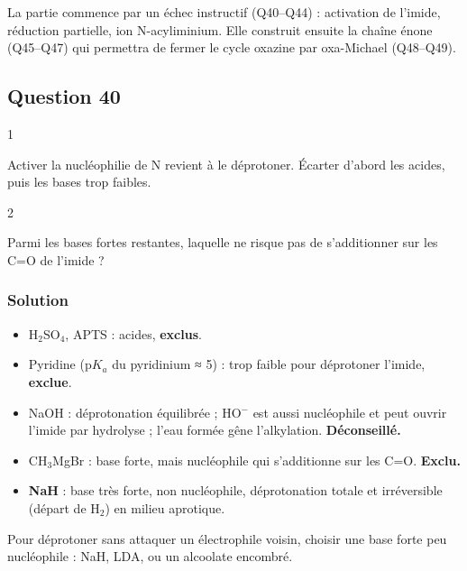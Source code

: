 \documentclass[11pt,a4paper]{article}
\providecommand{\tightlist}{\setlength{\itemsep}{0pt}\setlength{\parskip}{0pt}}
\newcommand{\equationajustee}[1]{%
  \sbox{\boiteequation}{$\displaystyle #1$}%
  \ifdim\wd\boiteequation>\linewidth
    \[\resizebox{\linewidth}{!}{\usebox{\boiteequation}}\]%
  \else
    \[#1\]%
  \fi}
\begin{document}
La partie commence par un échec instructif (Q40--Q44) : activation de l'imide, réduction partielle, ion N-acyliminium. Elle construit ensuite la chaîne énone (Q45--Q47) qui permettra de fermer le cycle oxazine par oxa-Michael (Q48--Q49).

\hypertarget{question-40}{%
\subsection{Question 40}\label{question-40}}

\begin{indication}{1}

Activer la nucléophilie de N revient à le déprotoner. Écarter d'abord les acides, puis les bases trop faibles.

\end{indication}

\begin{indication}{2}

Parmi les bases fortes restantes, laquelle ne risque pas de s'additionner sur les C=O de l'imide ?

\end{indication}

\hypertarget{solution-39}{%
\subsubsection{Solution}\label{solution-39}}

\begin{itemize}
\tightlist
\item
  H\(_2\)SO\(_4\), APTS : acides, \textbf{exclus}.
\item
  Pyridine (p\(K_a\) du pyridinium ≈ 5) : trop faible pour déprotoner l'imide, \textbf{exclue}.
\item
  NaOH : déprotonation équilibrée ; HO\(^-\) est aussi nucléophile et peut ouvrir l'imide par hydrolyse ; l'eau formée gêne l'alkylation. \textbf{Déconseillé.}
\item
  CH\(_3\)MgBr : base forte, mais nucléophile qui s'additionne sur les C=O. \textbf{Exclu.}
\item
  \textbf{NaH} : base très forte, non nucléophile, déprotonation totale et irréversible (départ de H\(_2\)) en milieu aprotique.
\end{itemize}

\equationajustee{\boxed{\mathrm{R1}=\mathrm{NaH}}}

\begin{methode}

Pour déprotoner sans attaquer un électrophile voisin, choisir une base forte peu nucléophile : NaH, LDA, ou un alcoolate encombré.

\end{methode}
\end{document}
